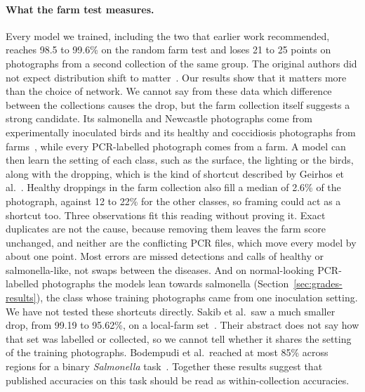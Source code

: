 \documentclass[10pt,twocolumn]{article}
\begin{document}
\paragraph{What the farm test measures.} Every model we trained, including the two that earlier work recommended,
reaches 98.5 to 99.6\% on the random farm test and loses 21 to 25 points on photographs from a second collection of
the same group. The original authors did not expect distribution shift to matter~\cite{machuve2022}. Our results show
that it matters more than the choice of network. We cannot say from these data which difference between the
collections causes the drop, but the farm collection itself suggests a strong candidate. Its salmonella and
Newcastle photographs come from experimentally inoculated birds and its healthy and coccidiosis photographs from
farms~\cite{machuve2021farm}, while every PCR-labelled photograph comes from a farm. A model can then learn the
setting of each class, such as the surface, the lighting or the birds, along with the dropping, which is the kind of
shortcut described by Geirhos et al.~\cite{geirhos2020}. Healthy droppings in the farm collection also fill a median
of 2.6\% of the photograph, against 12 to 22\% for the other classes, so framing could act as a shortcut too. Three
observations fit this reading without proving it. Exact duplicates are not the cause, because removing them leaves
the farm score unchanged, and neither are the conflicting PCR files, which move every model by about one point. Most
errors are missed detections and calls of healthy or salmonella-like, not swaps between the diseases. And on
normal-looking PCR-labelled photographs the models lean towards salmonella (Section~\ref{sec:grades-results}), the class
whose training photographs came from one inoculation setting. We have not tested these shortcuts directly. Sakib et
al.\ saw a much smaller drop, from 99.19 to 95.62\%, on a local-farm set~\cite{sakib2026}. Their abstract does not say
how that set was labelled or collected, so we cannot tell whether it shares the setting of the training photographs.
Bodempudi et al.\ reached at most 85\% across regions for a binary \emph{Salmonella} task~\cite{bodempudi2026}.
Together these results suggest that published accuracies on this task should be read as within-collection
accuracies.
\end{document}
